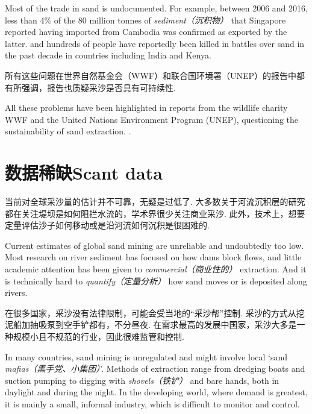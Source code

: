 \begin{multicols}{2}
Most of the trade in sand is undocumented. For example, between 2006 and 2016, less than 4\% of the 80 million tonnes of \emph{sediment（沉积物）} that Singapore reported having imported from Cambodia was confirmed as exported by the latter. and hundreds of people have reportedly been killed in battles over sand in the past decade in countries including India and Kenya.



所有这些问题在世界自然基金会（WWF）和联合国环境署（UNEP）的报告中都有所强调，报告也质疑采沙是否具有可持续性. 

All these problems have been highlighted in reports from the wildlife charity WWF and the United Nations Environment Program (UNEP), questioning the sustainability of sand extraction. .


\section*{数据稀缺\quad Scant data}

当前对全球采沙量的估计并不可靠，无疑是过低了. 大多数关于河流沉积层的研究都在关注堤坝是如何阻拦水流的，学术界很少关注商业采沙. 此外，技术上，想要定量评估沙子如何移动或是沿河流如何沉积是很困难的. 

Current estimates of global sand mining are unreliable and undoubtedly too low. Most research on river sediment has focused on how dams block flows, and little academic attention has been given to  \emph{commercial（商业性的）} extraction. And it is technically hard to  \emph{quantify（定量分析）} how sand moves or is deposited along rivers.


在很多国家，采沙没有法律限制，可能会受当地的“采沙帮”控制. 采沙的方式从挖泥船加抽吸泵到空手铲都有，不分昼夜. 在需求最高的发展中国家，采沙大多是一种规模小且不规范的行业，因此很难监管和控制. 

In many countries, sand mining is unregulated and might involve local ‘sand  \emph{mafias（黑手党、小集团）}’. Methods of extraction range from dredging boats and suction pumping to digging with  \emph{shovels（铁铲）} and bare hands, both in daylight and during the night. In the developing world, where demand is greatest, it is mainly a small, informal industry, which is difficult to monitor and control.


\end{multicols}
